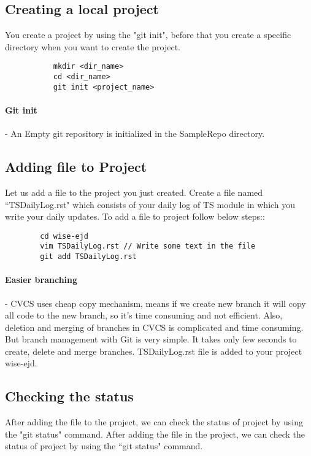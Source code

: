 \documentclass{book}
\begin{document}
    \subsection*{Creating a local project}
    You create a project by using the "git init", before that you create a specific directory when you want to create the project.
    \begin{verbatim}
           mkdir <dir_name>
           cd <dir_name>
           git init <project_name>
    \end{verbatim}
    \paragraph{Git init} - An Empty git repository is initialized in the SampleRepo directory.

    \subsection*{Adding file to Project}
    Let us add a file to the project you just created. Create a file named ``TSDailyLog.rst" which consists of your daily log of TS module in which you write your daily updates. To add a file to project follow below steps::
    \begin{verbatim}
        cd wise-ejd
        vim TSDailyLog.rst // Write some text in the file
        git add TSDailyLog.rst
    \end{verbatim}

    \paragraph {Easier branching} - CVCS uses cheap copy mechanism, means if we create new branch it will copy all code to the new branch, so it’s time consuming and not efficient. Also, deletion and merging of branches in CVCS is complicated and time consuming. But branch management with Git is very simple. It takes only few seconds to create, delete and merge branches. TSDailyLog.rst file is added to your project wise-ejd.
    
    \subsection*{Checking the status}
    After adding the file to the project, we can check the status of project by using the "git status" command. After adding the file in the project, we can check the status of project by using the ``git status" command.
    
\end{document}
